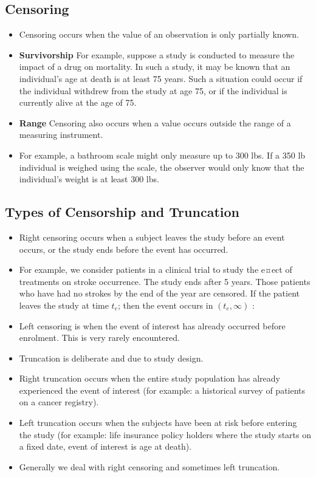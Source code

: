 
\subsection{Censoring}

\begin{itemize}
\item Censoring occurs when the value of an observation is only partially known. 
\item \textbf{Survivorship} For example, suppose a study is conducted to measure the impact of a drug on mortality. 
In such a study, it may be known that an individual's age at death is at least 75 years. 
Such a situation could occur if the individual withdrew from the study at age 75, or if the individual is currently 
alive at the age of 75.
\item \textbf{Range} Censoring also occurs when a value occurs outside the range of a measuring instrument. 
\item For example, a bathroom scale might only measure up to 300 lbs. 
If a 350 lb individual is weighed using the scale, the observer would only know that the individual's weight is at 
least 300 lbs.
\end{itemize}
\newpage
\subsection*{Types of Censorship and Truncation}
\begin{itemize}
\item Right censoring occurs when a subject leaves the study before an event occurs,
or the study ends before the event has occurred. 
\item For example, we consider
patients in a clinical trial to study the e¤ect of treatments on stroke occurrence.
The study ends after 5 years. Those patients who have had no strokes by the
end of the year are censored. If the patient leaves the study at time $t_e$; then the
event occurs in $(t_e, \infty)$ :
\item Left censoring is when the event of interest has already occurred before
enrolment. This is very rarely encountered.
\item Truncation is deliberate and due to study design.
\item Right truncation occurs when the entire study population has already
experienced the event of interest (for example: a historical survey of patients
on a cancer registry).
\item Left truncation occurs when the subjects have been at risk before entering
the study (for example: life insurance policy holders where the study starts on
a fixed date, event of interest is age at death).
\item Generally we deal with right censoring and sometimes left truncation.
\end{itemize}

